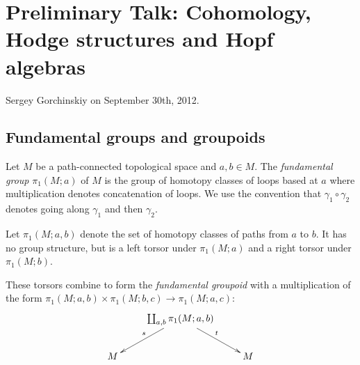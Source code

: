 \chapter*{Preliminary Talk: Cohomology, Hodge structures and Hopf algebras}

Sergey Gorchinskiy on September 30th, 2012.

\section{Fundamental groups and groupoids}

\begin{defn}\label{def:fundgroup}
Let $M$ be a path-connected topological space and $a, b \in M$. The \emph{fundamental group} $\pi_1(M;a)$ of $M$ is the group of homotopy classes of loops based at $a$ where multiplication denotes concatenation of loops. We use the convention that $\gamma_1 \circ \gamma_2$ denotes going along $\gamma_1$ and then $\gamma_2$. 

Let $\pi_1(M; a, b)$ denote the set of homotopy classes of paths from $a$ to $b$. It has no group structure, but is a left torsor under $\pi_1(M; a)$ and a right torsor under $\pi_1(M; b)$. 

These torsors combine to form the \emph{fundamental groupoid} with a multiplication of the form $\pi_1(M; a, b) \times \pi_1(M; b, c) \to \pi_1(M; a, c)$:
\[
\xymatrix{
& \coprod_{a,b} \pi_1(M; a, b) \ar[dl]_s \ar[dr]^t & \\
M & & M
}
\]
\end{defn}

